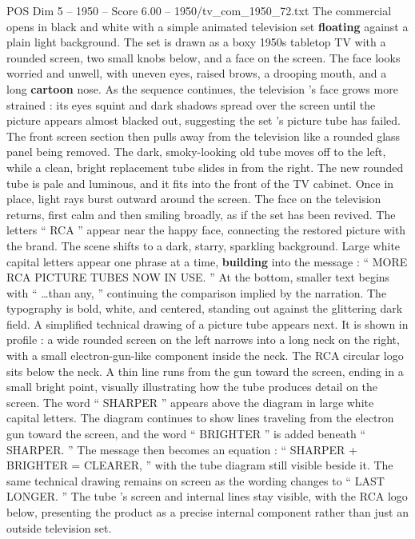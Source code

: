\begin{textsample}{POS Dim 5 – 1950 – Score 6.00 – 1950/tv\_com\_1950\_72.txt}  \label{ex:f5_pos_076}
The commercial opens in black and white with a simple animated television set \textbf{floating} against a plain light background.
The set is drawn as a boxy 1950s tabletop TV with a rounded screen, two small knobs below, and a face on the screen.
The face looks worried and unwell, with uneven eyes, raised brows, a drooping mouth, and a long \textbf{cartoon} nose.
As the sequence continues, the television ’s face grows more strained : its eyes squint and dark shadows spread over the screen until the picture appears almost blacked out, suggesting the set ’s picture tube has failed.
The front screen section then pulls away from the television like a rounded glass panel being removed.
The dark, smoky-looking old tube moves off to the left, while a clean, bright replacement tube slides in from the right.
The new rounded tube is pale and luminous, and it fits into the front of the TV cabinet.
Once in place, light rays burst outward around the screen.
The face on the television returns, first calm and then smiling broadly, as if the set has been revived.
The letters “ RCA ” appear near the happy face, connecting the restored picture with the brand.
The scene shifts to a dark, starry, sparkling background.
Large white capital letters appear one phrase at a time, \textbf{building} into the message : “ MORE RCA PICTURE TUBES NOW IN USE. ” At the bottom, smaller text begins with “ …than any, ” continuing the comparison implied by the narration.
The typography is bold, white, and centered, standing out against the glittering dark field.
A simplified technical drawing of a picture tube appears next.
It is shown in profile : a wide rounded screen on the left narrows into a long neck on the right, with a small electron-gun-like component inside the neck.
The RCA circular logo sits below the neck.
A thin line runs from the gun toward the screen, ending in a small bright point, visually illustrating how the tube produces detail on the screen.
The word “ SHARPER ” appears above the diagram in large white capital letters.
The diagram continues to show lines traveling from the electron gun toward the screen, and the word “ BRIGHTER ” is added beneath “ SHARPER. ” The message then becomes an equation : “ SHARPER + BRIGHTER = CLEARER, ” with the tube diagram still visible beside it.
The same technical drawing remains on screen as the wording changes to “ LAST LONGER. ” The tube ’s screen and internal lines stay visible, with the RCA logo below, presenting the product as a precise internal component rather than just an outside television set.

\end{textsample}
